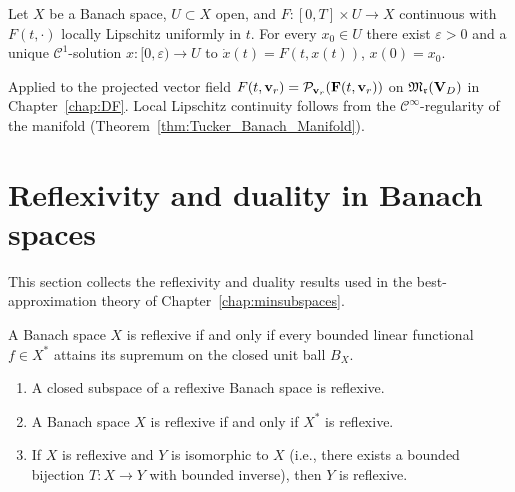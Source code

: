 \begin{theorem}
\label{thm:app:picard}
Let $X$ be a Banach space, $U\subset X$ open, and
$F:[0,T]\times U\to X$ continuous with $F(t,\cdot)$ locally Lipschitz
uniformly in $t$. For every $x_0\in U$ there exist $\varepsilon>0$
and a unique $\mathcal{C}^1$-solution $x:[0,\varepsilon)\to U$ to
$\dot x(t)=F(t,x(t))$, $x(0)=x_0$.
\end{theorem}

Applied to the projected vector field
$F(t,\mathbf{v}_r)=\mathcal{P}_{\mathbf{v}_r}(\mathbf{F}(t,\mathbf{v}_r))$ on $\mathfrak{M}_{\mathfrak{r}}(\mathbf{V}_D)$
in Chapter~\ref{chap:DF}. Local Lipschitz continuity follows from
the $\mathcal{C}^\infty$-regularity of the manifold
(Theorem~\ref{thm:Tucker_Banach_Manifold}).

\section{Reflexivity and duality in Banach spaces}
\label{app:functional:reflexivity}

This section collects the reflexivity and duality results used in the
best-approximation theory of Chapter~\ref{chap:minsubspaces}.

\begin{theorem}
\label{thm:app:james}
A Banach space $X$ is reflexive if and only if every bounded linear
functional $f \in X^*$ attains its supremum on the closed unit ball
$B_X$.
\end{theorem}

\begin{proposition}
\label{prop:app:reflexivity_stability}
\begin{enumerate}
\item[\textup{(i)}] A closed subspace of a reflexive Banach space is
    reflexive.
\item[\textup{(ii)}] A Banach space $X$ is reflexive if and only if
    $X^*$ is reflexive.
\item[\textup{(iii)}] If $X$ is reflexive and $Y$ is isomorphic to $X$
    (i.e., there exists a bounded bijection $T: X \to Y$ with bounded
    inverse), then $Y$ is reflexive.
\end{enumerate}
\end{proposition}

